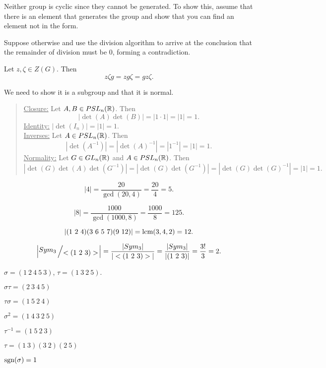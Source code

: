 \begin{compactenum}
    \item Neither group is cyclic since they cannot be generated. To show this, assume that there is an element that generates the group and show that you can find an element not in the form.

    \item Suppose otherwise and use the division algorithm to arrive at the conclusion that the remainder of division must be 0, forming a contradiction.

    \item Let $z,\zeta\in Z(G)$. Then
    \[
        z\zeta g = z g \zeta = g z\zeta.
    \]

    \item We need to show it is a subgroup and that it is normal.
    \begin{quote}
        \underline{Closure:} Let $A,B\in PSL_{n}(\mathbb{R})$. Then
        \[
            |\det(A)\det(B)|=|1\cdot1|=|1|=1.
        \]
        \underline{Identity:} $|\det(I_{n})|=|1|=1$.\\
        \underline{Inverses:} Let $A\in PSL_{n}(\mathbb{R})$. Then
        \[
            |\det(A^{-1})|=|\det(A)^{-1}|=|1^{-1}|=|1|=1.
        \]
        \underline{Normality:} Let $G\in GL_{n}(\mathbb{R})$ and $A\in PSL_{n}(\mathbb{R})$. Then
        \[
            |\det(G)\det(A)\det(G^{-1})|=|\det(G)\det(G^{-1})|=|\det(G)\det(G)^{-1}|=|1|=1.
        \]
    \end{quote}

    \item
    \begin{compactenum}
        \item
        \[
            |4|=\frac{20}{\gcd(20,4)}=\frac{20}{4} = 5.
        \]
        \item
        \[
            |8| = \frac{1000}{\gcd(1000,8)}=\frac{1000}{8}= 125.
        \]
        \item
        \[
            |(1\ 2\ 4)(3\ 6\ 5\ 7)(9\ 12)|=\lcm(3,4,2)=12.
        \]
    \end{compactenum}

    \item
    \[
        \left|\fgroup{Sym_{3}}{<(1\ 2\ 3)>}\right|=\frac{|Sym_{3}|}{|<(1\ 2\ 3)>|}
        =\frac{|Sym_{3}|}{|(1\ 2\ 3)|} = \frac{3!}{3} = 2.
    \]

    \item
    \begin{compactenum}
        \item $\sigma=(1\ 2\ 4\ 5\ 3)$, $\tau=(1\ 3\ 2\ 5)$.
        \item $\sigma\tau=(2\ 3\ 4\ 5)$
        \item $\tau\sigma=(1\ 5\ 2\ 4)$
        \item $\sigma^{2}=(1\ 4\ 3\ 2\ 5)$
        \item $\tau^{-1}=(1\ 5\ 2\ 3)$
        \item $\tau=(1\ 3)(3\ 2)(2\ 5)$
        \item $\text{sgn}(\sigma)=1$
    \end{compactenum}


\end{compactenum}
